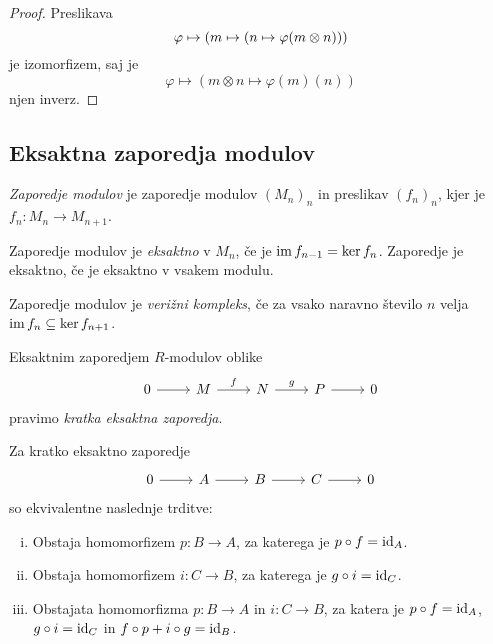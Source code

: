 \begin{proof}
Preslikava
\[
\varphi \mapsto
\left(m \mapsto \left(n \mapsto \varphi(m \otimes n)\right)\right)
\]
je izomorfizem, saj je
\[
\varphi \mapsto (m \otimes n \mapsto \varphi(m)(n))
\]
njen inverz.
\end{proof}

\newpage

\subsection{Eksaktna zaporedja modulov}

\begin{definicija}
\emph{Zaporedje modulov} je zaporedje
modulov $(M_n)_n$ in preslikav $(f_n)_n$, kjer je
$f_n \colon M_n \to M_{n+1}$.
\end{definicija}

\begin{definicija}
Zaporedje modulov je
\emph{eksaktno} v $M_n$, če je
$\operatorname{im} f_{n-1} = \ker f_n$. Zaporedje je eksaktno, če je eksaktno v
vsakem modulu.
\end{definicija}

\begin{definicija}
Zaporedje modulov je
\emph{verižni kompleks}, če za vsako
naravno število $n$ velja $\operatorname{im} f_n \subseteq \ker f_{n+1}$.
\end{definicija}

\begin{definicija}
Eksaktnim zaporedjem $R$-modulov oblike
\[
\begin{tikzcd}
0 \arrow[r] & M \arrow["f",r] & N \arrow["g", r] & P \arrow[r] & 0
\end{tikzcd}
\]
pravimo \emph{kratka eksaktna zaporedja}.
\end{definicija}

\begin{trditev}
Za kratko eksaktno zaporedje
\[
\begin{tikzcd}
0 \arrow[r] & A \arrow[r] & B \arrow[r] & C \arrow[r] & 0
\end{tikzcd}
\]
so ekvivalentne naslednje trditve:

\begin{enumerate}[i)]
\item Obstaja homomorfizem $p \colon B \to A$, za katerega je
$p \circ f = \operatorname{id}_A$.
\item Obstaja homomorfizem $i \colon C \to B$, za katerega je
$g \circ i = \operatorname{id}_C$.
\item Obstajata homomorfizma $p \colon B \to A$ in
$i \colon C \to B$, za katera je $p \circ f = \operatorname{id}_A$,
$g \circ i = \operatorname{id}_C$ in $f \circ p + i \circ g = \operatorname{id}_B$.
\end{enumerate}
\end{trditev}

